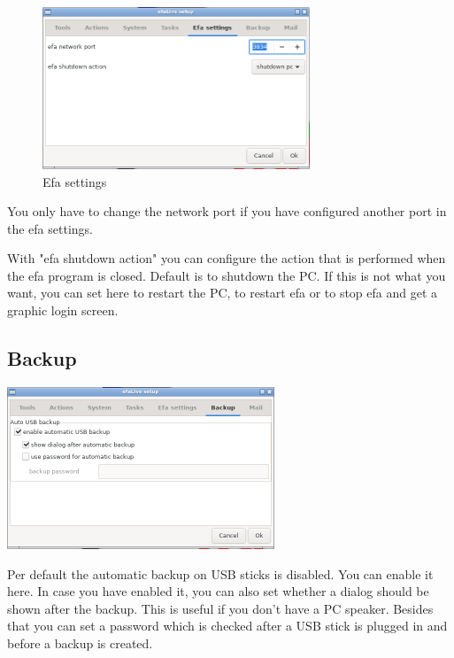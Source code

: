 \documentclass[a4paper,12pt,twoside]{article}
\begin{document}
\begin{figure}
    \centering
    \includegraphics[width=8cm]{screenshots/efalive_setup_efa-settings.png}
    \caption{Efa settings}
    \label{fig:efalivesetup_efasettings}
\end{figure}

You only have to change the network port
if you have configured another port in the efa settings.

With "efa shutdown action" you can configure
the action that is performed when the efa program is closed. Default is
to shutdown the PC. If this is not what you want, you can set here to
restart the PC, to restart efa or to stop efa and get a graphic login 
screen.


\subsection{Backup}
\label{sct:efalivesetup_backup}

\bigskip
\begin{minipage}{\linewidth}
    \centering
    \captionsetup{type=figure}
    \includegraphics[width=8cm]{screenshots/efalive_setup_backup.png}
    \label{fig:efalivesetup_backup}
\end{minipage}
\bigskip

Per default the automatic backup on USB sticks is disabled. You can
enable it here. In case you have enabled it, you can also set whether a
dialog should be shown after the backup. This is useful if you
don't have a PC speaker. Besides that you can set a password which is
checked after a USB stick is plugged in and before a backup is created.
\end{document}
